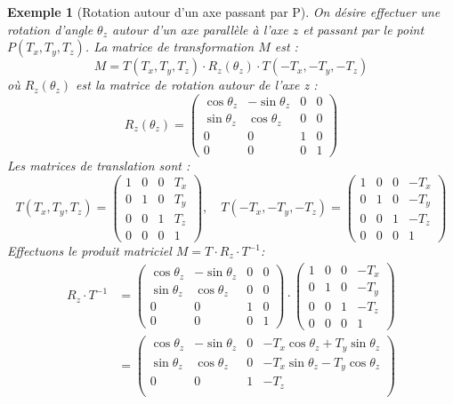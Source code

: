 \documentclass{article}
\newtheorem{example}{Exemple}
\begin{document}
\begin{example}[Rotation autour d'un axe passant par P]
On désire effectuer une rotation d'angle $\theta_z$ autour d'un axe parallèle à l'axe $z$ et passant par le point $P(T_x, T_y, T_z)$.
La matrice de transformation $M$ est :
\[ M = T(T_x, T_y, T_z) \cdot R_z(\theta_z) \cdot T(-T_x, -T_y, -T_z) \]
où $R_z(\theta_z)$ est la matrice de rotation autour de l'axe z :
\[
R_z(\theta_z) = \begin{pmatrix}
\cos\theta_z & -\sin\theta_z & 0 & 0 \\
\sin\theta_z & \cos\theta_z & 0 & 0 \\
0 & 0 & 1 & 0 \\
0 & 0 & 0 & 1
\end{pmatrix}
\]
Les matrices de translation sont :
\[
T(T_x, T_y, T_z) = \begin{pmatrix} 1 & 0 & 0 & T_x \\ 0 & 1 & 0 & T_y \\ 0 & 0 & 1 & T_z \\ 0 & 0 & 0 & 1 \end{pmatrix}, \quad
T(-T_x, -T_y, -T_z) = \begin{pmatrix} 1 & 0 & 0 & -T_x \\ 0 & 1 & 0 & -T_y \\ 0 & 0 & 1 & -T_z \\ 0 & 0 & 0 & 1 \end{pmatrix}
\]
Effectuons le produit matriciel $M = T \cdot R_z \cdot T^{-1}$:
\begin{align*}
R_z \cdot T^{-1} &= \begin{pmatrix}
\cos\theta_z & -\sin\theta_z & 0 & 0 \\
\sin\theta_z & \cos\theta_z & 0 & 0 \\
0 & 0 & 1 & 0 \\
0 & 0 & 0 & 1
\end{pmatrix} \cdot \begin{pmatrix} 1 & 0 & 0 & -T_x \\ 0 & 1 & 0 & -T_y \\ 0 & 0 & 1 & -T_z \\ 0 & 0 & 0 & 1 \end{pmatrix} \\
&= \begin{pmatrix}
\cos\theta_z & -\sin\theta_z & 0 & -T_x \cos\theta_z + T_y \sin\theta_z \\
\sin\theta_z & \cos\theta_z & 0 & -T_x \sin\theta_z - T_y \cos\theta_z \\
0 & 0 & 1 & -T_z \\

\end{pmatrix}
\end{align*}
\end{example}
\end{document}
